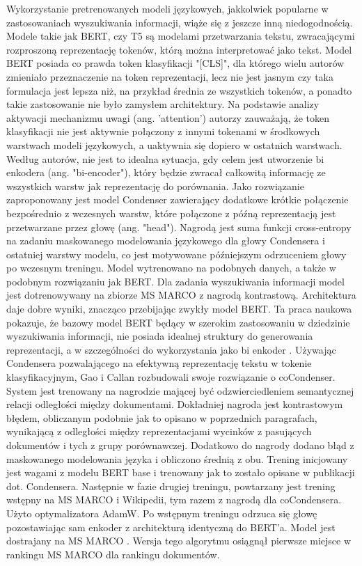 Wykorzystanie pretrenowanych modeli językowych, jakkolwiek popularne w zastosowaniach
wyszukiwania informacji, wiąże się z jeszcze inną niedogodnością. Modele takie jak BERT, czy T5 są
modelami przetwarzania tekstu, zwracającymi rozproszoną reprezentację tokenów, którą można
interpretować jako tekst. Model BERT posiada co prawda token klasyfikacji "[CLS]", dla którego wielu
autorów zmieniało przeznaczenie na token reprezentacji, lecz nie jest jasnym czy taka formulacja jest
lepsza niż, na przykład średnia ze wszystkich tokenów, a ponadto takie zastosowanie nie było
zamysłem architektury. Na podstawie analizy aktywacji mechanizmu uwagi (ang. 'attention') autorzy
zauważają, że token klasyfikacji nie jest aktywnie połączony z innymi tokenami w środkowych
warstwach modeli językowych, a uaktywnia się dopiero w ostatnich warstwach. Według autorów, nie
jest to idealna sytuacja, gdy celem jest utworzenie bi enkodera (ang. "bi-encoder"), który będzie
zwracał całkowitą informację ze wszystkich warstw jak reprezentację do porównania. Jako rozwiązanie
zaproponowany jest model Condenser zawierający dodatkowe krótkie połączenie bezpośrednio z wczesnych warstw, które połączone z późną reprezentacją jest przetwarzane przez głowę (ang.
"head"). Nagrodą jest suma funkcji cross-entropy na zadaniu maskowanego modelowania językowego
dla głowy Condensera i ostatniej warstwy modelu, co jest motywowane późniejszym odrzuceniem
głowy po wczesnym treningu. Model wytrenowano na podobnych danych, a także w podobnym
rozwiązaniu jak BERT. Dla zadania wyszukiwania informacji model jest dotrenowywany na zbiorze MS
MARCO z nagrodą kontrastową. Architektura daje dobre wyniki, znacząco przebijając zwykły model
BERT. Ta praca naukowa pokazuje, że bazowy model BERT będący w szerokim zastosowaniu w
dziedzinie wyszukiwania informacji, nie posiada idealnej struktury do generowania reprezentacji, a w
szczególności do wykorzystania jako bi enkoder \autocite{gao2021condenser}.
Używając Condensera pozwalającego na efektywną reprezentację tekstu w tokenie
klasyfikacyjnym, Gao i Callan rozbudowali swoje rozwiązanie o coCondenser. System jest trenowany
na nagrodzie mającej być odzwierciedleniem semantycznej relacji odległości między dokumentami.
Dokładniej nagroda jest kontrastowym błędem, obliczanym podobnie jak to opisano w poprzednich
paragrafach, wynikającą z odległości między reprezentacjami wycinków z pasujących dokumentów i
tych z grupy porównawczej. Dodatkowo do nagrody dodano błąd z maskowanego modelowania języka i obliczono średnią z obu. Trening inicjowany jest wagami z modelu BERT base i trenowany jak to
zostało opisane w publikacji dot. Condensera. Następnie w fazie drugiej treningu, powtarzany jest
trening wstępny na MS MARCO i Wikipedii, tym razem z nagrodą dla coCondensera. Użyto
optymalizatora AdamW. Po wstępnym treningu odrzuca się głowę pozostawiając sam enkoder z
architekturą identyczną do BERT'a. Model jest dostrajany na MS MARCO \autocite{gao2021unsupervised}. Wersja tego algorytmu
osiągnął pierwsze miejsce w rankingu MS MARCO dla rankingu dokumentów.



